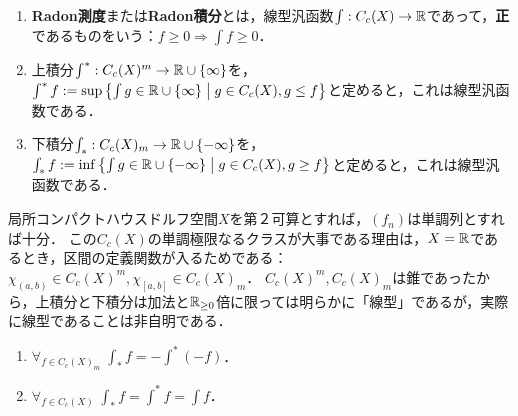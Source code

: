 \documentclass[uplatex,dvipdfmx]{jsreport}
\begin{document}
\begin{definition}\mbox{}
    \begin{enumerate}
        \item \textbf{Radon測度}または\textbf{Radon積分}とは，線型汎函数$\int:C_c(X)\to\mathbb{R}$であって，\textbf{正}であるものをいう：$f\ge 0\Rightarrow\int f\ge 0$．
        \item 上積分$\int^*:C_c(X)^m\to\mathbb{R}\cup\{\infty\}$を，$\int^*f:=\sup\left\{\int g\in\mathbb{R}\cup\{\infty\}\;\middle|\;g\in C_c(X),g\le f\right\}$と定めると，これは線型汎函数である．
        \item 下積分$\int_*:C_c(X)_m\to\mathbb{R}\cup\{-\infty\}$を，$\int_*f:=\inf\left\{\int g\in\mathbb{R}\cup\{-\infty\}\;\middle|\;g\in C_c(X),g\ge f\right\}$と定めると，これは線型汎函数である．
    \end{enumerate}
\end{definition}
\begin{remarks}
    局所コンパクトハウスドルフ空間$X$を第２可算とすれば，$(f_n)$は単調列とすれば十分．
    この$C_c(X)$の単調極限なるクラスが大事である理由は，$X=\mathbb{R}$であるとき，区間の定義関数が入るためである：$\chi_{(a,b)}\in C_c(X)^m,\chi_{[a,b]}\in C_c(X)_m$．
    $C_c(X)^m,C_c(X)_m$は錐であったから，上積分と下積分は加法と$\mathbb{R}_{\ge 0}$倍に限っては明らかに「線型」であるが，実際に線型であることは非自明である．
\end{remarks}

\begin{lemma}\mbox{}
    \begin{enumerate}
        \item $\forall_{f\in C_c(X)_m}\;\int_*f=-\int^*(-f)$．
        \item $\forall_{f\in C_c(X)}\;\int_*f=\int^*f=\int f$．
    \end{enumerate}
\end{lemma}
\end{document}
